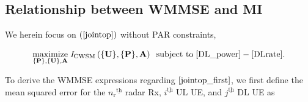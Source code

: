 \documentclass[10pt,journal]{IEEEtran}
\newcommand{\paren}[1]{\left({#1}\right)}
\newcommand{\braces}[1]{{\left\{ {#1}\right\}}}
\newcommand{\ith}[1]    {{#1}^{\underline{\text{th}}}}
\newcommand{\rr}{_\mathrm{r}}
\newcommand{\B}{\textrm{B}}
\theoremstyle{definition}
\begin{document}
\subsection{Relationship between WMMSE and MI}
\label{subsec: MMSE section}
We herein focus on $\paren{\mathrm{\ref{jointop}}}$ without PAR constraints,
\par\noindent\small
\begin{equation}\label{jointop_first}
\underset{{\braces{\mathbf{P}},\braces{\mathbf{U}},
\mathbf{A}}}{\text{maximize}}\; \mathit{I}_{\textrm{CWSM}}\paren{\braces{\mathbf{U}},\braces{\mathbf{P}},\mathbf{A}}\;\;\text{subject to}\; %
\eqref{DL_power}-\eqref{DLrate}.
\end{equation}\normalsize

To derive the WMMSE expressions regarding $\ref{jointop_first}$, we first define the mean squared error for the $\ith{n\rr}$ radar Rx, $\ith{i}$ UL UE, and $\ith{j}$ DL UE as \par\noindent\small
\iffalse
\end{document}
